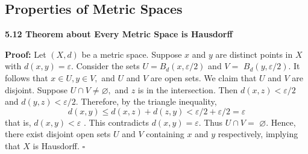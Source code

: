 \documentclass[12pt]{article}
\newenvironment{proofed}[1][]{\par \medskip \noindent \textbf{#1 Proof: }}{\hfill$\square$}
\newenvironment{thm}[2][]{\par \medskip \noindent \textbf{#1 Theorem about \large#2 \medskip \\}}{\rmfamily \medskip}
\begin{document}
\subsection*{Properties of Metric Spaces}
	\begin{thm}[5.12]{Every Metric Space is Hausdorff}
		\begin{proofed}
			Let $( X , d )$ be a metric space. Suppose $x$ and $y$ are distinct points
			in $X$ with $d ( x , y ) = \varepsilon .$ Consider the sets $U = B _ { d } ( x , \varepsilon / 2 )$ and $V =$
			$B _ { d } ( y , \varepsilon / 2 ) .$ It follows that $x \in U , y \in V ,$ and $U$ and $V$ are open sets. We claim that $U$ and $V$ are disjoint. Suppose $U \cap V \neq \varnothing ,$ and $z$ is in the
			intersection. Then $d ( x , z ) < \varepsilon / 2$ and $d ( y , z ) < \varepsilon / 2 .$ Therefore, by the
			triangle inequality,
			\[d ( x , y ) \leq d ( x , z ) + d ( z , y ) < \varepsilon / 2 + \varepsilon / 2 = \varepsilon\]
			that is, $d ( x , y ) < \varepsilon$ . This contradicts $d ( x , y ) = \varepsilon .$ Thus $U \cap V =$
			$\varnothing .$ Hence, there exist disjoint open sets $U$ and $V$ containing $x$ and $y$
			respectively, implying that $X$ is Hausdorff.
		\end{proofed}
	\end{thm}
\end{document}
